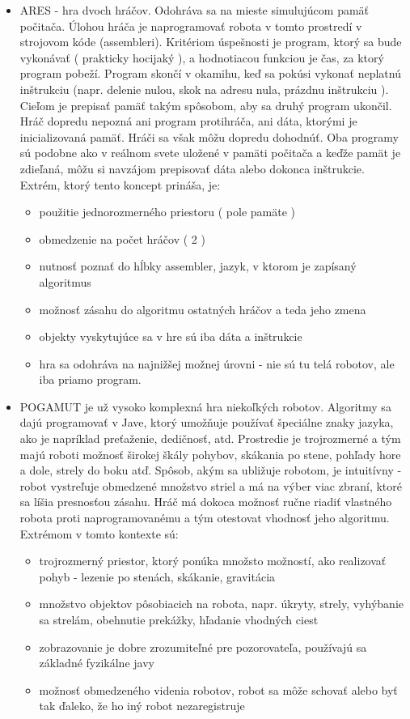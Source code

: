 \begin{itemize}
\item ARES - hra dvoch hráčov. Odohráva sa na mieste simulujúcom pamäť počitača. Úlohou hráča je naprogramovať robota v tomto prostredí v strojovom kóde (assembleri). Kritériom úspešnosti je program, ktorý sa bude vykonávať ( prakticky hocijaký ), a hodnotiacou funkciou je čas, za ktorý program pobeží. Program skončí v okamihu, keď sa pokúsi vykonať neplatnú inštrukciu (napr. delenie nulou, skok na adresu nula, prázdnu inštrukciu ).  Cieľom je prepisať pamäť takým spôsobom, aby sa druhý program ukončil. Hráč dopredu nepozná ani program protihráča, ani dáta, ktorými je inicializovaná pamäť. Hráči sa však môžu dopredu dohodnúť. Oba programy sú podobne ako v reálnom svete uložené v pamäti počitača a keďže pamät je zdieľaná, môžu si navzájom prepisovať dáta alebo dokonca inštrukcie. Extrém, ktorý tento koncept prináša, je: %
\begin{itemize}
\item použitie jednorozmerného priestoru ( pole pamäte ) 
\item obmedzenie na počet hráčov ( 2 )
\item nutnosť poznať do hĺbky assembler, jazyk, v ktorom je zapísaný algoritmus
\item možnosť zásahu do algoritmu ostatných hráčov a teda jeho zmena
\item objekty vyskytujúce sa v hre sú iba dáta a inštrukcie
\item hra sa odohráva na najnižšej možnej úrovni -  nie sú tu telá robotov, ale iba priamo program.
\end{itemize}
\item POGAMUT je už vysoko komplexná hra niekoľkých robotov. Algoritmy sa dajú programovať v Jave, ktorý umožňuje používať špeciálne znaky jazyka, ako je napríklad preťaženie, dedičnosť, atd. Prostredie je trojrozmerné a tým majú roboti možnosť širokej škály pohybov, skákania po stene, pohľady hore a dole, strely do boku atď. Spôsob, akým sa ubližuje robotom, je intuitívny - robot vystreľuje obmedzené množstvo striel a má na výber viac zbraní, ktoré sa líšia presnosťou zásahu. Hráč má dokoca možnosť ručne riadiť vlastného robota proti naprogramovanému a tým otestovat vhodnosť jeho algoritmu. \\
Extrémom v tomto kontexte sú:
\begin{itemize}
\item trojrozmerný priestor, ktorý ponúka množsto možností, ako realizovať pohyb - lezenie po stenách, skákanie, gravitácia
\item množstvo objektov pôsobiacich na robota, napr. úkryty, strely, vyhýbanie sa strelám, obehnutie prekážky, hľadanie vhodných ciest
\item zobrazovanie je dobre zrozumiteľné pre pozorovateľa, používajú sa základné fyzikálne javy 
\item možnosť obmedzeného videnia robotov, robot sa môže schovať alebo byť tak ďaleko, že ho iný robot nezaregistruje
\end{itemize}
\end{itemize}
